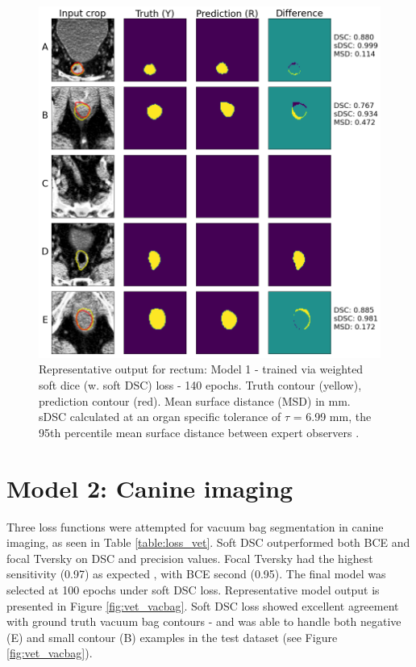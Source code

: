 \begin{figure}[H]
	\begin{center}
		\includegraphics[width=1.0\textwidth]{figures/prostate_rectum}
		\caption{Representative output for rectum: Model 1 - trained via weighted soft dice (w. soft DSC) loss - 140 epochs. Truth contour (yellow), prediction contour (red). Mean surface distance (MSD) in mm. sDSC \cite{Nikolov_2018} calculated at an organ specific tolerance of $\tau$ = 6.99 mm, the 95th percentile mean surface distance between expert observers \cite{Roach_2019}.}
		\label{fig:prostate_rectum}
	\end{center}
\end{figure}

\section{Model 2: Canine imaging}

Three loss functions were attempted for vacuum bag segmentation in canine imaging, as seen in Table \ref{table:loss_vet}. Soft DSC outperformed both BCE and focal Tversky on DSC and precision values. Focal Tversky had the highest sensitivity (0.97) as expected \cite{Khan2019}, with BCE second (0.95). The final model was selected at 100 epochs under soft DSC loss. Representative model output is presented in Figure \ref{fig:vet_vacbag}. Soft DSC loss showed excellent agreement with ground truth vacuum bag contours - and was able to handle both negative (E) and small contour (B) examples in the test dataset (see Figure \ref{fig:vet_vacbag}).


